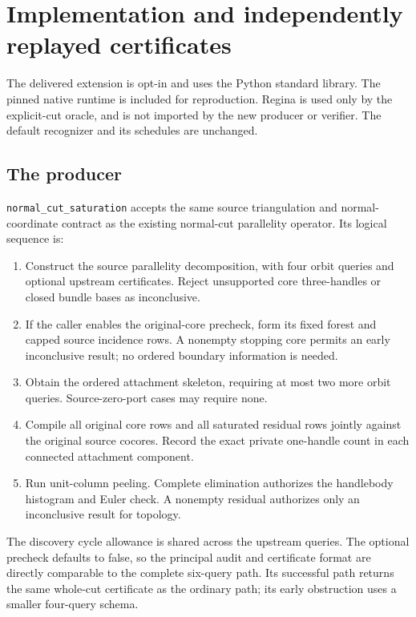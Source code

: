 \section{Implementation and independently replayed certificates}
\label{sec:implementation}

The delivered extension is opt-in and uses the Python standard library.
The pinned native runtime is included for reproduction.  Regina is used
only by the explicit-cut oracle, and is not imported by the new producer
or verifier.  The default recognizer and its schedules are unchanged.

\subsection{The producer}

\texttt{normal\_cut\_saturation} accepts the same source triangulation and
normal-coordinate contract as the existing normal-cut parallelity operator.
Its logical sequence is:
\begin{enumerate}
\item Construct the source parallelity decomposition, with four orbit
queries and optional upstream certificates.  Reject unsupported core
three-handles or closed bundle bases as inconclusive.
\item If the caller enables the original-core precheck, form its fixed
forest and capped source incidence rows.  A nonempty stopping core permits
an early inconclusive result; no ordered boundary information is needed.
\item Obtain the ordered attachment skeleton, requiring at most two more
orbit queries.  Source-zero-port cases may require none.
\item Compile all original core rows and all saturated residual rows
jointly against the original source cocores.  Record the exact private
one-handle count in each connected attachment component.
\item Run unit-column peeling.  Complete elimination authorizes the
handlebody histogram and Euler check.  A nonempty residual authorizes only
an inconclusive result for topology.
\end{enumerate}

The discovery cycle allowance is shared across the upstream queries.
The optional precheck defaults to false, so the principal audit and
certificate format are directly comparable to the complete six-query
path.  Its successful path returns the same whole-cut certificate as the
ordinary path; its early obstruction uses a smaller four-query schema.


